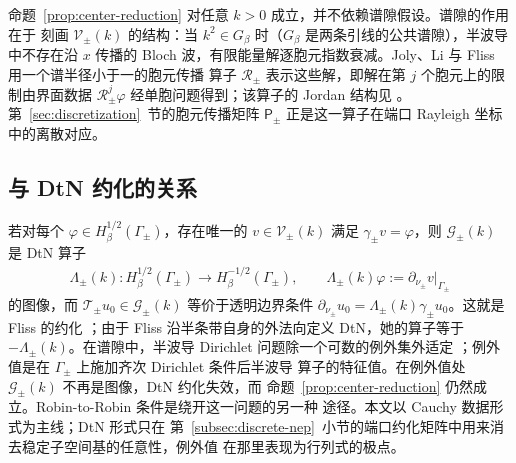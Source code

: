 命题~\ref{prop:center-reduction} 对任意 $k>0$ 成立，并不依赖谱隙假设。谱隙的作用在于
刻画 $\mathcal V_\pm(k)$ 的结构：当 $k^2\in G_\beta$ 时（$G_\beta$ 是两条引线的公共谱隙），半波导中不存在沿 $x$ 传播的
Bloch 波，有限能量解逐胞元指数衰减。Joly、Li 与 Fliss 用一个谱半径小于一的胞元传播
算子 $\mathcal R_\pm$ 表示这些解，即解在第 $j$ 个胞元上的限制由界面数据
$\mathcal R_\pm^j\varphi$ 经单胞问题得到\cite{JolyLiFliss2006}；该算子的 Jordan 结构见
\cite{HohageSoussi2013}。第~\ref{sec:discretization}~节的胞元传播矩阵
$\mathsf P_\pm$ 正是这一算子在端口 Rayleigh 坐标中的离散对应。

\subsection{与 DtN 约化的关系}
\label{subsec:dtn-form}

若对每个 $\varphi\in H^{1/2}_\beta(\Gamma_\pm)$，存在唯一的 $v\in\mathcal V_\pm(k)$ 满足
$\gamma_\pm v=\varphi$，则 $\mathcal G_\pm(k)$ 是 DtN 算子
\begin{align}
  \Lambda_\pm(k):H^{1/2}_\beta(\Gamma_\pm)\to H^{-1/2}_\beta(\Gamma_\pm),
  \qquad
  \Lambda_\pm(k)\varphi:=\partial_{\nu_\pm}v|_{\Gamma_\pm}
  \label{eq:continuous-dtn}
\end{align}
的图像，而 $\mathscr T_\pm u_0\in\mathcal G_\pm(k)$ 等价于透明边界条件
$\partial_{\nu_\pm}u_0=\Lambda_\pm(k)\gamma_\pm u_0$。这就是 Fliss 的约化
\cite[定理~4.5]{Fliss2013}；由于 Fliss 沿半条带自身的外法向定义 DtN，她的算子等于
$-\Lambda_\pm(k)$。在谱隙中，半波导 Dirichlet 问题除一个可数的例外集外适定
\cite[定理~4.1]{Fliss2013}；例外值是在 $\Gamma_\pm$ 上施加齐次 Dirichlet 条件后半波导
算子的特征值。在例外值处 $\mathcal G_\pm(k)$ 不再是图像，DtN 约化失效，而
命题~\ref{prop:center-reduction} 仍然成立。Robin-to-Robin 条件是绕开这一问题的另一种
途径\cite{FlissKlindworthSchmidt2015}。本文以 Cauchy 数据形式为主线；DtN 形式只在
第~\ref{subsec:discrete-nep}~小节的端口约化矩阵中用来消去稳定子空间基的任意性，例外值
在那里表现为行列式的极点。
